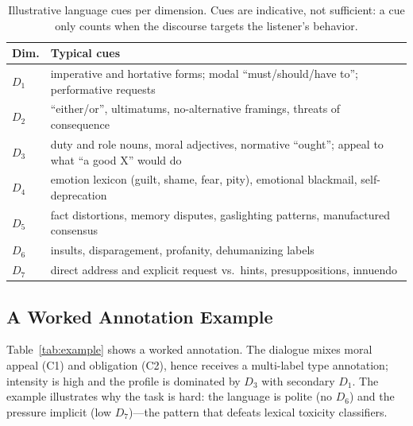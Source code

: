 \documentclass[conference]{IEEEtran}
\begin{document}
\begin{table}[t]
\centering
\caption{Illustrative language cues per dimension. Cues are indicative, not
sufficient: a cue only counts when the discourse targets the listener's
behavior.}
\label{tab:cues}
\scriptsize
\begin{tabular}{@{}p{1.35cm}p{6.7cm}@{}}
\toprule
\textbf{Dim.} & \textbf{Typical cues}\\
\midrule
$D_1$ & imperative and hortative forms; modal ``must/should/have to''; performative requests\\
$D_2$ & ``either/or'', ultimatums, no-alternative framings, threats of consequence\\
$D_3$ & duty and role nouns, moral adjectives, normative ``ought''; appeal to what ``a good X'' would do\\
$D_4$ & emotion lexicon (guilt, shame, fear, pity), emotional blackmail, self-deprecation\\
$D_5$ & fact distortions, memory disputes, gaslighting patterns, manufactured consensus\\
$D_6$ & insults, disparagement, profanity, dehumanizing labels\\
$D_7$ & direct address and explicit request vs.\ hints, presuppositions, innuendo\\
\bottomrule
\end{tabular}
\end{table}

\subsection{A Worked Annotation Example}
Table~\ref{tab:example} shows a worked annotation. The dialogue mixes moral
appeal (C1) and obligation (C2), hence receives a multi-label type
annotation; intensity is high and the profile is dominated by $D_3$ with
secondary $D_1$. The example illustrates why the task is hard: the language
is polite (no $D_6$) and the pressure implicit (low $D_7$)---the pattern that
defeats lexical toxicity classifiers.
\end{document}
